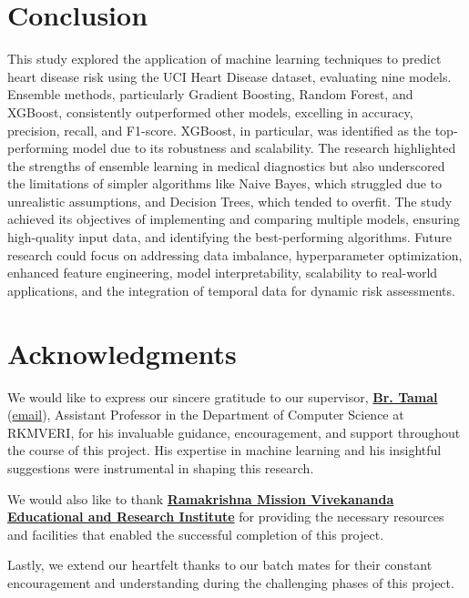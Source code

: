 \documentclass[pdflatex,sn-nature,Numbered]{sn-jnl}%
\theoremstyle{thmstyleone}%
\theoremstyle{thmstyletwo}%
\theoremstyle{thmstylethree}%
\begin{document}
\section{Conclusion}
This study explored the application of machine learning techniques to predict heart disease risk using the UCI Heart Disease dataset, evaluating nine models. Ensemble methods, particularly Gradient Boosting, Random Forest, and XGBoost, consistently outperformed other models, excelling in accuracy, precision, recall, and F1-score. XGBoost, in particular, was identified as the top-performing model due to its robustness and scalability. The research highlighted the strengths of ensemble learning in medical diagnostics but also underscored the limitations of simpler algorithms like Naive Bayes, which struggled due to unrealistic assumptions, and Decision Trees, which tended to overfit. The study achieved its objectives of implementing and comparing multiple models, ensuring high-quality input data, and identifying the best-performing algorithms. Future research could focus on addressing data imbalance, hyperparameter optimization, enhanced feature engineering, model interpretability, scalability to real-world applications, and the integration of temporal data for dynamic risk assessments.

\pagebreak
\section*{Acknowledgments}

We would like to express our sincere gratitude to our supervisor, \textbf{\href{https://cs.rkmvu.ac.in/~tamal/}{Br. Tamal}} (\href{tamal@gm.rkmvu.ac.in}{email}), Assistant Professor in the Department of Computer Science at RKMVERI, for his invaluable guidance, encouragement, and support throughout the course of this project. His expertise in machine learning and his insightful suggestions were instrumental in shaping this research.

We would also like to thank \textbf{\href{cs.rkmvu.ac.in}{Ramakrishna Mission Vivekananda Educational and Research Institute}} for providing the necessary resources and facilities that enabled the successful completion of this project.

Lastly, we extend our heartfelt thanks to our batch mates for their constant encouragement and understanding during the challenging phases of this project.
\pagebreak


\end{document}
